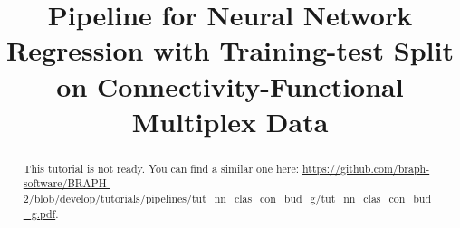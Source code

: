 \documentclass[justified]{tufte-handout}
\title[Regression Training-test Split Connectivity-Functional Multiplex Data]{Pipeline for Neural Network Regression with Training-test Split on Connectivity-Functional Multiplex Data}
\begin{document}
\maketitle

\begin{abstract}
\noindent
This tutorial is not ready. You can find a similar one here: \url{https://github.com/braph-software/BRAPH-2/blob/develop/tutorials/pipelines/tut_nn_clas_con_bud_g/tut_nn_clas_con_bud_g.pdf}.
\end{abstract}
\end{document}
